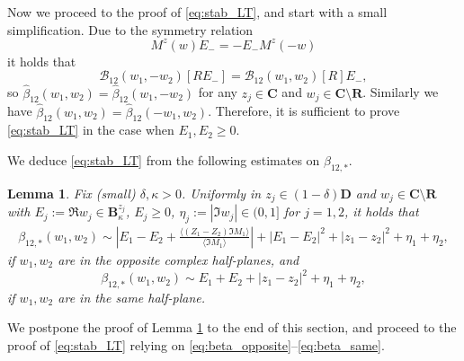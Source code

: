 \documentclass[10pt]{amsart}
\newtheorem{lemma}[theorem]{Lemma}
\numberwithin{equation}{section}
\newcommand{\R}{\mathbf{R}}
\newcommand{\C}{\mathbf{C}}
\begin{document}
Now we proceed to the proof of \eqref{eq:stab_LT}, and start with a small simplification. Due to the symmetry relation 
\begin{equation}
M^z(w)E_-=-E_-M^z(-w)
\label{eq:M_symmetry}
\end{equation}
it holds that
\begin{equation*}
\mathcal{B}_{12}(w_1,-w_2)[RE_-] = \mathcal{B}_{12}(w_1,w_2)[R]E_-,
\end{equation*}
so $\widehat{\beta}_{12}(w_1,w_2) = \widehat{\beta}_{12}(w_1,-w_2)$ for any $z_j\in \C$ and $w_j\in \C\setminus\R$. Similarly we have $\widehat{\beta}_{12}(w_1,w_2) = \widehat{\beta}_{12}(-w_1,w_2)$. Therefore, it is sufficient to prove \eqref{eq:stab_LT} in the case when $E_1, E_2\ge 0$.

We deduce \eqref{eq:stab_LT} from the following estimates on $\beta_{12,*}$.

\begin{lemma}\label{lem:beta_estimates} Fix (small) $\delta, \kappa>0$. Uniformly in $z_j\in (1-\delta)\mathbf{D}$ and $w_j\in \C\setminus\R$ with $E_j:=\Re w_j\in \mathbf{B}_\kappa^{z_j}$, $E_j\ge 0$, $\eta_j:=|\Im w_j|\in (0,1]$ for $j=1,2$, it holds that
\begin{align}
\beta_{12,*}(w_1,w_2)\sim \left\vert E_1-E_2 + \frac{\langle (Z_1-Z_2)\Im M_1\rangle}{\langle \Im M_1\rangle}\right\vert + |E_1-E_2|^2 + |z_1-z_2|^2 +\eta_1+\eta_2,
\label{eq:beta_opposite}
\end{align}
if $w_1,w_2$ are in the opposite complex half-planes, and
\begin{equation}
\beta_{12,*}(w_1,w_2)\sim E_1+E_2 + |z_1-z_2|^2 +\eta_1+\eta_2,
\label{eq:beta_same}
\end{equation}
if $w_1,w_2$ are in the same half-plane.
\end{lemma}

We postpone the proof of Lemma \ref{lem:beta_estimates} to the end of this section, and proceed to the proof of \eqref{eq:stab_LT} relying on \eqref{eq:beta_opposite}--\eqref{eq:beta_same}.
\end{document}
